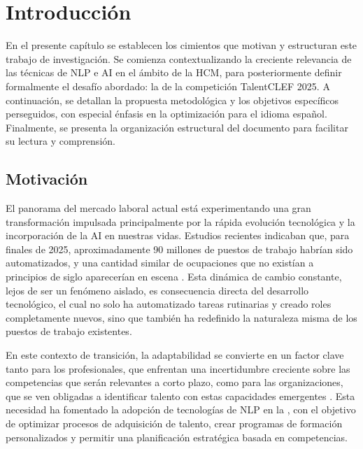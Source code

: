 
\chapter{Introducción}
\label{ch:Introduccion}

\noindent En el presente capítulo se establecen los cimientos que motivan y estructuran este trabajo de investigación. Se comienza contextualizando la creciente relevancia de las técnicas de \gls{NLP} e \gls{AI} en el ámbito de la \gls{HCM}, para posteriormente definir formalmente el desafío abordado: la  de la competición TalentCLEF 2025. A continuación, se detallan la propuesta metodológica y los objetivos específicos perseguidos, con especial énfasis en la optimización para el idioma español. Finalmente, se presenta la organización estructural del documento para facilitar su lectura y comprensión.

\section{Motivación}
\label{sec:Motivacion}

\noindent El panorama del mercado laboral actual está experimentando una gran transformación impulsada principalmente por la rápida evolución tecnológica y la incorporación de la \gls{AI} en nuestras vidas. Estudios recientes indicaban que, para finales de 2025, aproximadamente 90 millones de puestos de trabajo habrían sido automatizados, y una cantidad similar de ocupaciones que no existían a principios de siglo aparecerían en escena \cite{maslej2025artificial}. Esta dinámica de cambio constante, lejos de ser un fenómeno aislado, es consecuencia directa del desarrollo tecnológico, el cual no solo ha automatizado tareas rutinarias y creado roles completamente nuevos, sino que también ha redefinido la naturaleza misma de los puestos de trabajo existentes.

En este contexto de transición, la adaptabilidad se convierte en un factor clave tanto para los profesionales, que enfrentan una incertidumbre creciente sobre las competencias que serán relevantes a corto plazo, como para las organizaciones, que se ven obligadas a identificar talento con estas capacidades emergentes \cite{ordonez2008competencies}. Esta necesidad ha fomentado la adopción de tecnologías de \gls{NLP} en la , con el objetivo de optimizar procesos de adquisición de talento, crear programas de formación personalizados y permitir una planificación estratégica basada en competencias.

